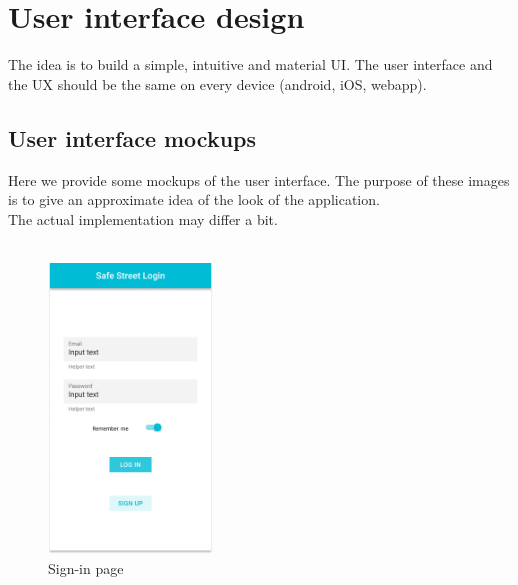 \documentclass{article}
\begin{document}
\section{User interface design}
\label{sec:UI}
The idea is to build a simple, intuitive and material UI. The user interface and the UX should be the same on every device (android, iOS, webapp).
\subsection{User interface mockups}
Here we provide some mockups of the user interface. The purpose of these images is to give an approximate idea of the look of the application. 
\\ The actual implementation may differ a bit.\\ \\
\begin{figure}[!htb]
		\centering
		\includegraphics[height=7.7cm,keepaspectratio]{images/mockups/Sign_in.png}
		\caption{Sign-in page}
\end{figure}
\clearpage
\end{document}
